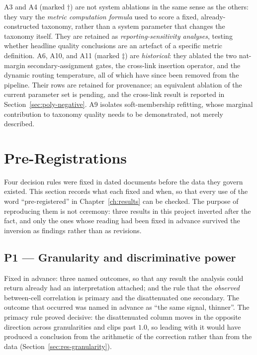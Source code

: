 A3 and A4 (marked $\dagger$) are not
system ablations in the same sense as the others: they vary the
\textit{metric computation formula} used to score a fixed,
already-constructed taxonomy, rather than a system parameter that
changes the taxonomy itself. They are retained as
\textit{reporting-sensitivity analyses}, testing whether headline
quality conclusions are an artefact of a specific metric definition.
A6, A10, and A11 (marked $\ddagger$) are \textit{historical}: they
ablated the two nat-margin secondary-assignment gates, the cross-link
insertion operator, and the dynamic routing temperature, all of which
have since been removed from the pipeline.
Their rows are retained for provenance; an equivalent ablation of
the current parameter set is pending, and the cross-link result is
reported in Section~\ref{sec:poly-negative}.
A9 isolates soft-membership refitting, whose marginal contribution to
taxonomy quality needs to be demonstrated, not merely described.


\section{Pre-Registrations}\label{app:preregs}

Four decision rules were fixed in dated documents before the data they
govern existed. This section records what each fixed and when, so that
every use of the word ``pre-registered'' in
Chapter~\ref{ch:results} can be checked. The purpose of reproducing
them is not ceremony: three results in this project inverted after the
fact, and only the ones whose reading had been fixed in advance
survived the inversion as findings rather than as revisions.

\subsection*{P1 --- Granularity and discriminative power}

Fixed in advance: three named outcomes, so that any result the analysis
could return already had an interpretation attached; and the rule that
the \emph{observed} between-cell correlation is primary and the
disattenuated one secondary. The outcome that occurred was named in
advance as ``the same signal, thinner''. The primacy rule proved
decisive: the disattenuated column moves in the opposite direction
across granularities and clips past $1.0$, so leading with it would
have produced a conclusion from the arithmetic of the correction rather
than from the data (Section~\ref{sec:res-granularity}).

